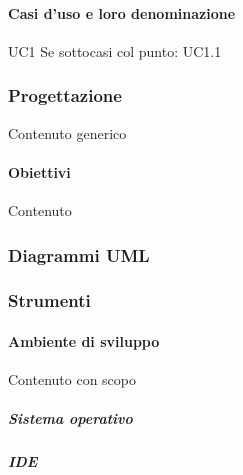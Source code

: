 		        \paragraph{Casi d'uso e loro denominazione}\label{PP:Sviluppo:AdR:CasiUso}
		        UC1
		        Se sottocasi col punto: UC1.1
		        


        \subsubsection{Progettazione}\label{PP:Sviluppo:Progettazione}
        Contenuto generico
        

		    \paragraph{Obiettivi}\label{PP:Sviluppo:Progettazione:Obiettivi}
		    Contenuto



		\subsubsection{Diagrammi UML}\label{PP:Sviluppo:UML}	
		
		

        
        \subsubsection{Strumenti}\label{PP:Sviluppo:Strumenti}
        
	        \paragraph{Ambiente di sviluppo}\label{PP:Sviluppo:Strumenti:AmbienteSviluppo}
	        Contenuto con scopo
	        	
	        \subparagraph{Sistema operativo}\label{PP:Sviluppo:Strumenti:AmbienteSviluppo:SistemaOperativo}
	        		
	        \subparagraph{IDE}\label{PP:Sviluppo:Strumenti:AmbienteSviluppo:IDE}
        
		
		
	